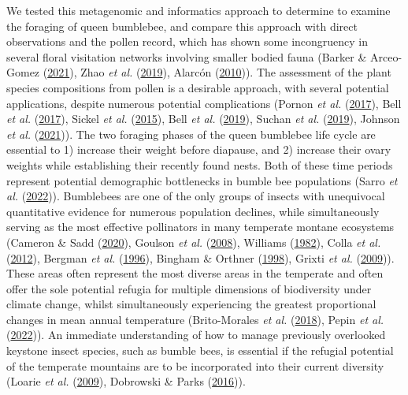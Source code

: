 \documentclass[
]{article}
\begin{document}
We tested this metagenomic and informatics approach to determine to
examine the foraging of queen bumblebee, and compare this approach with
direct observations and the pollen record, which has shown some
incongruency in several floral visitation networks involving smaller
bodied fauna (Barker \& Arceo-Gomez
(\protect\hyperlink{ref-barker2021pollen}{2021}), Zhao \emph{et al.}
(\protect\hyperlink{ref-zhao2019topology}{2019}), Alarcón
(\protect\hyperlink{ref-alarcon2010congruence}{2010})). The assessment
of the plant species compositions from pollen is a desirable approach,
with several potential applications, despite numerous potential
complications (Pornon \emph{et al.}
(\protect\hyperlink{ref-pornon2017dna}{2017}), Bell \emph{et al.}
(\protect\hyperlink{ref-bell2017applying}{2017}), Sickel \emph{et al.}
(\protect\hyperlink{ref-sickel2015increased}{2015}), Bell \emph{et al.}
(\protect\hyperlink{ref-bell2019quantitative}{2019}), Suchan \emph{et
al.} (\protect\hyperlink{ref-suchan2019pollen}{2019}), Johnson \emph{et
al.} (\protect\hyperlink{ref-johnson2021airborne}{2021})). The two
foraging phases of the queen bumblebee life cycle are essential to 1)
increase their weight before diapause, and 2) increase their ovary
weights while establishing their recently found nests. Both of these
time periods represent potential demographic bottlenecks in bumble bee
populations (Sarro \emph{et al.}
(\protect\hyperlink{ref-sarro2022bumble}{2022})). Bumblebees are one of
the only groups of insects with unequivocal quantitative evidence for
numerous population declines, while simultaneously serving as the most
effective pollinators in many temperate montane ecosystems (Cameron \&
Sadd (\protect\hyperlink{ref-cameron2020global}{2020}), Goulson \emph{et
al.} (\protect\hyperlink{ref-goulson2008decline}{2008}), Williams
(\protect\hyperlink{ref-williams1982distribution}{1982}), Colla \emph{et
al.} (\protect\hyperlink{ref-colla2012assessing}{2012}), Bergman
\emph{et al.}
(\protect\hyperlink{ref-bergman1996micrometeorological}{1996}), Bingham
\& Orthner (\protect\hyperlink{ref-bingham1998efficient}{1998}), Grixti
\emph{et al.} (\protect\hyperlink{ref-grixti2009decline}{2009})). These
areas often represent the most diverse areas in the temperate and often
offer the sole potential refugia for multiple dimensions of biodiversity
under climate change, whilst simultaneously experiencing the greatest
proportional changes in mean annual temperature (Brito-Morales \emph{et
al.} (\protect\hyperlink{ref-brito2018climate}{2018}), Pepin \emph{et
al.} (\protect\hyperlink{ref-pepin2022climate}{2022})). An immediate
understanding of how to manage previously overlooked keystone insect
species, such as bumble bees, is essential if the refugial potential of
the temperate mountains are to be incorporated into their current
diversity (Loarie \emph{et al.}
(\protect\hyperlink{ref-loarie2009velocity}{2009}), Dobrowski \& Parks
(\protect\hyperlink{ref-dobrowski2016climate}{2016})).
\end{document}
